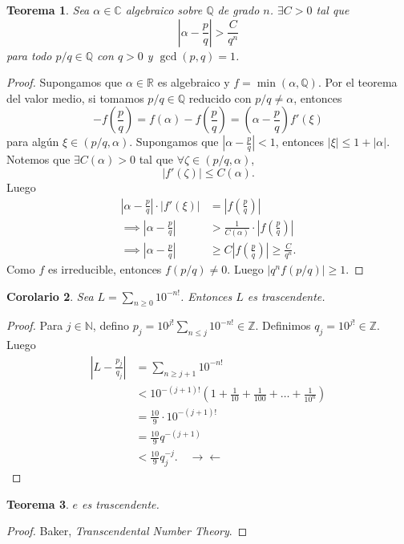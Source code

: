 \documentclass{article}
\newtheorem{theorem}{Teorema}[subsection]
\newtheorem{corollary}[theorem]{Corolario}
\theoremstyle{definition}
\theoremstyle{remark}
\numberwithin{equation}{section}
\newcommand{\C}{\mathbb{C}}
\newcommand{\N}{\mathbb{N}}
\newcommand{\Q}{\mathbb{Q}}
\newcommand{\R}{\mathbb{R}}
\newcommand{\Z}{\mathbb{Z}}
\renewcommand{\a}{\alpha}
\renewcommand{\c}{\cdot}
\newcommand{\abs}[1]{\left| #1 \right|}
\newcommand{\br}[1]{\left( #1 \right)}
\newcommand{\ds}{\displaystyle}
\begin{document}
\begin{theorem}
  Sea $\a \in \C$ algebraico sobre $\Q$ de grado $n$. $\exists C>0$ tal que
  \[ \abs{\a - \frac{p}{q}} > \frac{C}{q^n} \]
  para todo $p/q \in \Q$ con $q>0$ y $\gcd(p,q) = 1$.
\end{theorem}
\begin{proof}
  Supongamos que $\a \in \R$ es algebraico y $f = \min(\a,\Q)$. Por el teorema del valor medio, si tomamos $p/q \in \Q$ reducido con $p/q \neq \a$, entonces
  \[ - f \br{\frac pq} = f(\a) - f \br{\frac pq} = \br{\a - \frac pq} f'(\xi) \]
  para algún $\xi \in (p/q, \a)$.
  Supongamos que $\abs{\a - \frac pq} < 1$, entonces $\abs\xi \leq 1 + \abs\a$. Notemos que $\exists C(\a)>0$ tal que $\forall \zeta \in (p/q,\a)$,
  \[ \abs{f'(\zeta)} \leq C(\a). \]
  Luego
  \begin{align*}
      \abs{\a - \frac pq} \c \abs{f'(\xi)} &= \abs{f\br{\frac pq}} \\
      \implies \abs{\a - \frac pq} &> \frac{1}{C(\a)} \cdot \abs{f\br{\frac pq}} \\
      \implies \abs{\a - \frac pq} &\geq C \abs{f\br{\frac pq}} \geq \frac{C}{q^n}.
  \end{align*}
  Como $f$ es irreducible, entonces $f(p/q) \neq 0$. Luego $\abs{q^n f(p/q)} \geq 1$.
\end{proof}

\newpage
\begin{corollary}
  Sea $\ds L = \sum_{n\geq 0} 10^{-n!}$. Entonces $L$ es trascendente.
\end{corollary}
\begin{proof}
  Para $j \in \N$, defino $\ds p_j = 10^{j!} \sum_{n \leq j} 10^{-n!} \in \Z$. Definimos $q_j = 10^{j!} \in \Z$. Luego
  \begin{align*}
      \abs{L - \frac{p_j}{q_j}} &= \sum_{n \geq j+1} 10^{-n!} \\
      &< 10^{-(j+1)!} \br{1 + \frac{1}{10} + \frac{1}{100} + \dots + \frac{1}{10^n}} \\
      &= \frac{10}{9} \cdot 10^{-(j+1)!} \\
      &= \frac{10}{9} q^{-(j+1)} \\
      &< \frac{10}{9} q_j^{-j}. \quad \to\gets
  \end{align*}
\end{proof}

\begin{theorem}
  $e$ es trascendente.
\end{theorem}
\begin{proof}
  Baker, \emph{Transcendental Number Theory}.
\end{proof}
\end{document}
